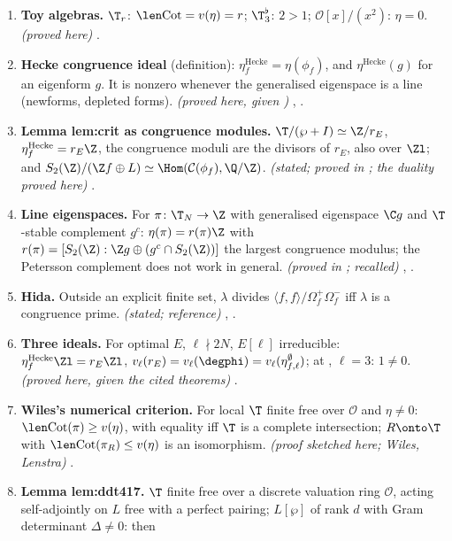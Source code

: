 \begin{enumerate}[label=\textbf{\thechapter.\arabic*}]
\item \textbf{Toy algebras.} $\T_r$: $\len\mathrm{Cot}=v(\eta)=r$; $\T_3^\flat$: $2>1$; $\mathcal O[x]/(x^2)$: $\eta=0$. \emph{(proved here)} .
\item \textbf{Hecke congruence ideal} (definition): $\eta^{\mathrm{Hecke}}_f=\eta(\phi_f)$, and $\eta^{\mathrm{Hecke}}(g)$ for an eigenform $g$. It is nonzero whenever the generalised eigenspace is a line (newforms, depleted forms).
\emph{(proved here, given )} , .
\item \textbf{Lemma lem:crit as congruence modules.} $\T/(\wp+I)\simeq\Z/r_E$, $\eta^{\mathrm{Hecke}}_f=r_E\Z$, the congruence moduli are the divisors of $r_E$, also over $\Zl$; and
$S_2(\Z)/(\Z f\oplus L)\simeq\Hom(\mathcal C(\phi_f),\Q/\Z)$. \emph{(stated; proved in ; the duality proved here)} .
\item \textbf{Line eigenspaces.} For $\pi\colon\T_N\to\Z$ with generalised eigenspace $\C g$ and $\T$-stable complement $g^c$: $\eta(\pi)=r(\pi)\Z$ with $r(\pi)=[S_2(\Z):\Z g\oplus(g^c\cap S_2(\Z))]$ the largest congruence modulus;
the Petersson complement does not work in general. \emph{(proved in ; recalled)} , .
\item \textbf{Hida.} Outside an explicit finite set, $\lambda$ divides $\langle f,f\rangle/\Omega^+_f\Omega^-_f$ iff $\lambda$ is a congruence prime. \emph{(stated; reference)} , .
\item \textbf{Three ideals.} For optimal $E$, $\ell\nmid2N$, $E[\ell]$ irreducible: $\eta^{\mathrm{Hecke}}_f\Zl=r_E\Zl$, $v_\ell(r_E)=v_\ell(\degphi)=v_\ell(\eta^\emptyset_{f,\ell})$; at , $\ell=3$: $1\ne0$. \emph{(proved here, given the cited theorems)}
.
\item \textbf{Wiles's numerical criterion.} For local $\T$ finite free over $\mathcal O$ and $\eta\ne0$: $\len\mathrm{Cot}(\pi)\ge v(\eta)$, with equality iff $\T$ is a complete intersection; $R\onto\T$ with $\len\mathrm{Cot}(\pi_R)\le v(\eta)$ is an
isomorphism. \emph{(proof sketched here; Wiles, Lenstra)} .
\item \textbf{Lemma lem:ddt417.} $\T$ finite free over a discrete valuation ring $\mathcal O$, acting self-adjointly on $L$ free with a perfect pairing; $L[\wp]$ of rank $d$ with Gram determinant $\Delta\ne0$: then

\end{enumerate}
